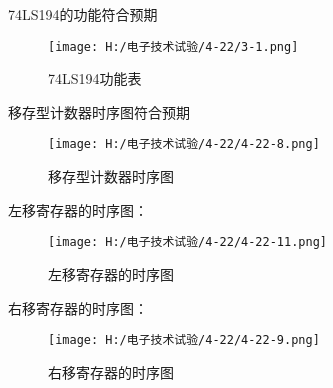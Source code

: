 \documentclass{article}
\begin{document}
74LS194的功能符合预期\par
\begin{figure}[h]
    \centering
    \texttt{[image: H:/电子技术试验/4-22/3-1.png]}
    \caption{74LS194功能表} \label{fig:aa}
    \end{figure}
    移存型计数器时序图符合预期\par
\begin{figure}[h]
    \centering
    \texttt{[image: H:/电子技术试验/4-22/4-22-8.png]}
    \caption{移存型计数器时序图} \label{fig:aa}
    \end{figure}
    \newpage
    左移寄存器的时序图：
    \begin{figure}[h]
        \centering
        \texttt{[image: H:/电子技术试验/4-22/4-22-11.png]}
        \caption{左移寄存器的时序图} \label{fig:aa}
        \end{figure}
    右移寄存器的时序图：
    \begin{figure}[h]
        \centering
        \texttt{[image: H:/电子技术试验/4-22/4-22-9.png]}
        \caption{右移寄存器的时序图} \label{fig:aa}
        \end{figure}
\end{document}
